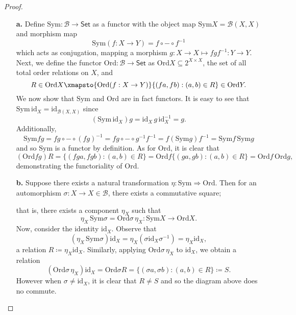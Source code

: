 \documentclass[ 12pt ]{article}
\begin{document}
\begin{enumerate}
\begin{enumerate}
			\begin{proof} $ $
				\begin{enumerate}
					\item[\textbf{a.}] Define $\mathrm{Sym} : \mathscr{B} \to \mathsf{Set}$ as a functor with the object map $\mathrm{Sym} X = \mathscr{B}(X, X)$ and morphism map $$\mathrm{Sym}(f : X \to Y) = f \circ - \circ f^{-1}$$ which acts as conjugation, mapping a morphism $g : X \to X \longmapsto f g f^{-1} : Y \to Y$. Next, we define the functor $\mathrm{Ord} : \mathscr{B} \to \mathsf{Set}$ as $\mathrm{Ord} X \subseteq 2^{X \times X}$, the set of all total order relations on $X$, and $$R \in \mathrm{Ord} X \xmapsto{\mathrm{Ord}(f : X \to Y)} \{ (fa, fb) : (a, b) \in R \} \in \mathrm{Ord} Y.$$ We now show that $\mathrm{Sym}$ and $\mathrm{Ord}$ are in fact functors. It is easy to see that $\mathrm{Sym}\, \mathrm{id}_X = \mathrm{id}_{\mathscr{B}(X, X)}$ since $$(\mathrm{Sym}\, \mathrm{id}_X) g = \mathrm{id}_X\, g\, \mathrm{id}_X^{-1} = g.$$ Additionally, $$\mathrm{Sym} fg = fg \circ - \circ (fg)^{-1} = fg \circ - \circ g^{-1} f^{-1} = f (\mathrm{Sym} g) f^{-1} = \mathrm{Sym} f\, \mathrm{Sym} g$$ and so $\mathrm{Sym}$ is a functor by definition. As for $\mathrm{Ord}$, it is clear that $$(\mathrm{Ord} fg) R = \{ (fga, fgb) : (a, b) \in R \} = \mathrm{Ord} f \{ (ga, gb) : (a, b) \in R \} = \mathrm{Ord} f\, \mathrm{Ord} g,$$ demonstrating the functoriality of $\mathrm{Ord}$.

					\item[\textbf{b.}] Suppose there exists a natural transformation $\eta : \mathrm{Sym} \Rightarrow \mathrm{Ord}$. Then for an automorphism $\sigma : X \to X \in \mathscr{B}$, there exists a commutative square;
					\begin{center}
					\end{center}
					that is, there exists a component $\eta_X$ such that $$\eta_X\, \mathrm{Sym} \sigma = \mathrm{Ord} \sigma\, \eta_X : \mathrm{Sym} X \to \mathrm{Ord} X.$$ Now, consider the identity $\mathrm{id}_X$. Observe that $$(\eta_X\, \mathrm{Sym} \sigma) \mathrm{id}_X = \eta_X (\sigma \mathrm{id}_X \sigma^{-1}) = \eta_X \mathrm{id}_X,$$ a relation $R \coloneqq \eta_X \mathrm{id}_X$. Similarly, applying $\mathrm{Ord} \sigma\, \eta_X$ to $\mathrm{id}_X$, we obtain a relation $$(\mathrm{Ord} \sigma\, \eta_X) \mathrm{id}_X = \mathrm{Ord} \sigma R = \{ (\sigma a, \sigma b) : (a, b) \in R \} \coloneqq S.$$ However when $\sigma \neq \mathrm{id}_X$, it is clear that $R \neq S$ and so the diagram above does no commute.


\end{enumerate}
\end{proof}
\end{enumerate}
\end{enumerate}
\end{document}
